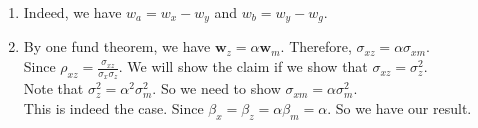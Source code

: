 \documentclass[12pt]{article}
\theoremstyle{definition}
\begin{document}
\begin{enumerate}
\begin{enumerate}
\item Indeed, we have $w_a = w_x-w_y$ and $w_b = w_y-w_g$.
\item By one fund theorem, we have $\mathbf{w}_z = \alpha\mathbf{w}_m$. Therefore, $\sigma_{xz} = \alpha\sigma_{xm}$.\\
Since $\rho_{xz}=\frac{\sigma_{xz}}{\sigma_x\sigma_z}$. We will show the claim if we show that $\sigma_{xz}=\sigma_{z}^2$.\\
Note that $\sigma_z^2 = \alpha^2\sigma_m^2$. So we need to show $\sigma_{xm}=\alpha\sigma_{m}^2$.\\
This is indeed the case. Since $\beta_x=\beta_z=\alpha\beta_m=\alpha$. So we have our result.
\end{enumerate}
\end{enumerate}
\end{document}
